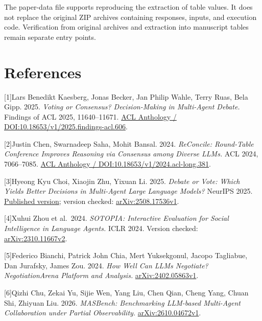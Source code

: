 \documentclass[10pt,a4paper]{article}
\begin{document}
The paper-data file supports reproducing the extraction of table values. It does not replace the original ZIP archives containing responses, inputs, and execution code. Verification from original archives and extraction into manuscript tables remain separate entry points.

\clearpage

\begingroup\raggedright

\section{References}\label{paper-04-references}

{[}1{]}Lars Benedikt Kaesberg, Jonas Becker, Jan Philip Wahle, Terry Ruas, Bela Gipp. 2025. \emph{Voting or Consensus? Decision-Making in Multi-Agent Debate.} Findings of ACL 2025, 11640--11671. \href{https://aclanthology.org/2025.findings-acl.606/}{ACL Anthology / DOI:10.18653/v1/2025.findings-acl.606}.

{[}2{]}Justin Chen, Swarnadeep Saha, Mohit Bansal. 2024. \emph{ReConcile: Round-Table Conference Improves Reasoning via Consensus among Diverse LLMs.} ACL 2024, 7066--7085. \href{https://aclanthology.org/2024.acl-long.381/}{ACL Anthology / DOI:10.18653/v1/2024.acl-long.381}.

{[}3{]}Hyeong Kyu Choi, Xiaojin Zhu, Yixuan Li. 2025. \emph{Debate or Vote: Which Yields Better Decisions in Multi-Agent Large Language Models?} NeurIPS 2025. \href{https://proceedings.neurips.cc/paper_files/paper/2025/hash/934252acd87f254d5d4672fbde283bd2-Abstract-Conference.html}{Published version}; version checked: \href{https://arxiv.org/html/2508.17536v1}{arXiv:2508.17536v1}.

{[}4{]}Xuhui Zhou et al.~2024. \emph{SOTOPIA: Interactive Evaluation for Social Intelligence in Language Agents.} ICLR 2024. Version checked: \href{https://arxiv.org/html/2310.11667v2}{arXiv:2310.11667v2}.

{[}5{]}Federico Bianchi, Patrick John Chia, Mert Yuksekgonul, Jacopo Tagliabue, Dan Jurafsky, James Zou. 2024. \emph{How Well Can LLMs Negotiate? NegotiationArena Platform and Analysis.} \href{https://arxiv.org/html/2402.05863v1}{arXiv:2402.05863v1}.

{[}6{]}Qizhi Chu, Zekai Yu, Sijie Wen, Yang Liu, Chen Qian, Cheng Yang, Chuan Shi, Zhiyuan Liu. 2026. \emph{MASBench: Benchmarking LLM-based Multi-Agent Collaboration under Partial Observability.} \href{https://arxiv.org/html/2610.04672v1}{arXiv:2610.04672v1}.
\end{document}
